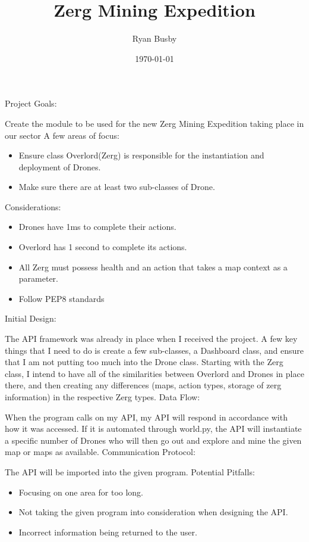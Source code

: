 \documentclass[12pt]{article}
\title{Zerg Mining Expedition}
\author{Ryan Busby}
\date{\today}
\begin{document}
\maketitle
\begin{flushleft}
Project Goals:
\end{flushleft}
Create the module to be used for the new Zerg Mining Expedition taking place in our sector  A few areas of focus:\par
\begin{itemize}
  \item Ensure class Overlord(Zerg) is responsible for the instantiation and deployment of Drones.
  \item Make sure there are at least two sub-classes of Drone.
\end{itemize}
Considerations:
\begin{itemize}
  \item Drones have 1ms to complete their actions.
  \item Overlord has 1 second to complete its actions.
  \item All Zerg must possess health and an action that takes a map context as a parameter.
  \item Follow PEP8 standards
\end{itemize}
Initial Design:

The API framework was already in place when I received the project.  A few key things that I need to do is create a few sub-classes, a Dashboard class, and ensure that I am not putting too much into the Drone class.  Starting with the Zerg class, I intend to have all of the similarities between Overlord and Drones in place there, and then creating any differences (maps, action types, storage of zerg information) in the respective Zerg types.
\newline
\newline
Data Flow:

When the program calls on my API, my API will respond in accordance with how it was accessed.  If it is automated through world.py, the API will instantiate a specific number of Drones who will then go out and explore and mine the given map or maps as available.
\newline
\newline
Communication Protocol:

The API will be imported into the given program.
\newline
\newline
Potential Pitfalls:
\begin{itemize}
  \item Focusing on one area for too long.
  \item Not taking the given program into consideration when designing the API.
  \item Incorrect information being returned to the user.
\end{itemize}
\end{document}
